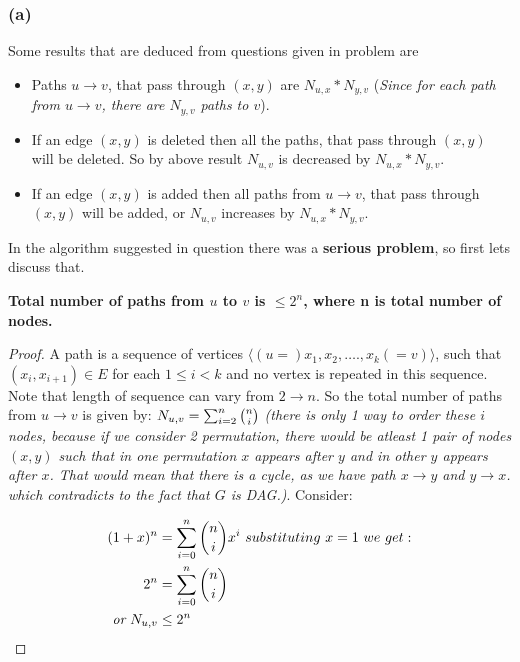 \documentclass[a4paper]{article}
\begin{document}
\subsubsection*{(a)}
Some results that are deduced from questions given in problem are
\begin{itemize}
 \item Paths $u \rightarrow v$, that pass through $(x, y)$ are $N_{u,x}*N_{y,v}$ (\textit{Since 
   for each path from $u \rightarrow v$, there are $N_{y,v}$ paths to $v$}).
 \item If an edge $(x, y)$ is deleted then all the paths, that pass through $(x,y)$ will be deleted.
    So by above result $N_{u,v}$ is decreased by $N_{u,x}*N_{y,v}$.
 \item If an edge $(x, y)$ is added then all paths from $u \rightarrow v$, that pass through $(x,y)$
      will be added, or $N_{u,v}$ increases by $N_{u,x}*N_{y,v}$.

\end{itemize}
In the algorithm suggested in question there was a \textbf{serious problem}, so first lets discuss that.

\begin{warn}[Lemma 1:]
\textbf{Total number of paths from $u$ to $v$ is $\leq 2^{n}$, where n is total number of nodes.} 
\end{warn}

\begin{proof}
A path is a sequence of vertices $\langle (u=)x_1,x_2,\ldots.,x_k(=v) \rangle$,
such that $(x_{i},x_{i+1}) \in E$ for each $1 \leq i < k$ and no vertex is repeated in this sequence.
Note that length of sequence can vary from $2 \rightarrow n$. So the total number of paths from 
$u \rightarrow v$ is given by: $N_{u,v} = \sum_{i=2}^{n} \binom{n}{i} \hfill$ \textit{(there
is only 1 way to order these $i$ nodes, because if we consider 2 permutation, there would be atleast 
1 pair of nodes $(x,y)$ such that in one permutation $x$ appears after $y$ and in other $y$
appears after $x$. That would mean that there is a cycle, as we have path $x \rightarrow y$ and 
$y \rightarrow x$. which contradicts to the fact that $G$ is DAG.)}. Consider:


\begin{align*}
 (1+x)^n & = \sum_{i=0}^{n} \binom{n}{i} x^i \ substituting\ x = 1\ we\ get: \\
 2^n & = \sum_{i=0}^{n} \binom{n}{i} \\
 \textit{or}\ N_{u,v} & \leq 2^n \qedhere
\end{align*}
\end{proof}
\end{document}

